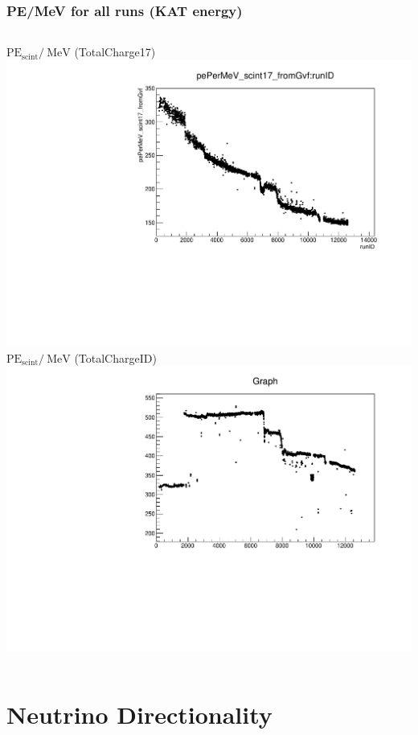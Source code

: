 \documentclass{beamer}
\begin{document}
\begin{frame}
	\frametitle{PE/MeV for all runs (KAT energy)}
	\begin{columns}[t]
		$\text{PE}_{\text{scint}}/\SI{}{\mega\electronvolt}$ (TotalCharge17)
		\includegraphics[width=\textwidth]{scint17_fromGvf_allRuns.pdf}
		$\text{PE}_{\text{scint}}/\SI{}{\mega\electronvolt}$ (TotalChargeID)
		\includegraphics[width=\textwidth]{scintID_fromGvf_allRuns.pdf}
	\end{columns}
\end{frame}

\section{Neutrino Directionality}
\end{document}
